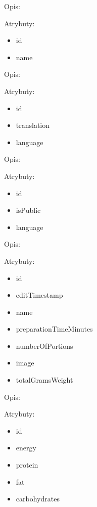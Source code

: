\begin{enumerate}[label={\textbf{KAT/\protect\threedigits{\theenumi}}}, wide, labelwidth=!, labelindent=0pt, series=reqs]
     \label{kat:DietType}

    Opis: \lipsum[1]
    \par
    Atrybuty:
    \begin{itemize}
        \item id
        \item name
    \end{itemize}

     \label{kat:DietTypeTranslation}

    Opis: \lipsum[1]
    \par
    Atrybuty:
    \begin{itemize}
        \item id
        \item translation
        \item language
    \end{itemize}

     \label{kat:Recipe}

    Opis: \lipsum[1]
    \par
    Atrybuty:
    \begin{itemize}
        \item id
        \item isPublic
        \item language
    \end{itemize}

     \label{kat:RecipeVersion}

    Opis: \lipsum[1]
    \par
    Atrybuty:
    \begin{itemize}
        \item id
        \item editTimestamp
        \item name
        \item preparationTimeMinutes
        \item numberOfPortions
        \item image
        \item totalGramsWeight
    \end{itemize}

     \label{kat:RecipeBasicNutritionData}

    Opis: \lipsum[1]
    \par
    Atrybuty:
    \begin{itemize}
        \item id
        \item energy
        \item protein
        \item fat
        \item carbohydrates
    \end{itemize}


\end{enumerate}

